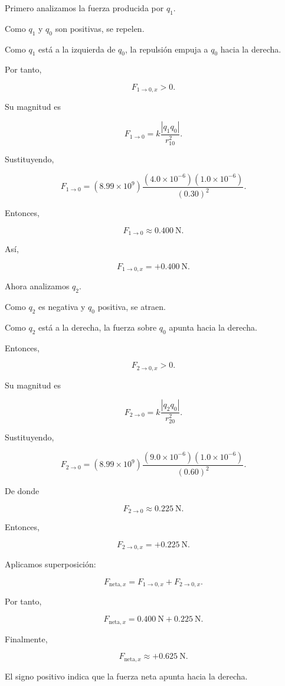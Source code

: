 Primero analizamos la fuerza producida por \(q_1\).

Como \(q_1\) y \(q_0\) son positivas, se repelen.

Como \(q_1\) está a la izquierda de \(q_0\), la repulsión empuja a \(q_0\)
hacia la derecha.

Por tanto,

\[
F_{1\to0,x}>0.
\]

Su magnitud es

\[
F_{1\to0}
=
k
\frac{|q_1q_0|}
{r_{10}^{2}}.
\]

Sustituyendo,

\[
F_{1\to0}
=
\left(8.99\times10^9\right)
\frac{
(4.0\times10^{-6})
(1.0\times10^{-6})
}{
(0.30)^2
}.
\]

Entonces,

\[
F_{1\to0}
\approx
\SI{0.400}{\newton}.
\]

Así,

\[
F_{1\to0,x}
=
+\SI{0.400}{\newton}.
\]

Ahora analizamos \(q_2\).

Como \(q_2\) es negativa y \(q_0\) positiva, se atraen.

Como \(q_2\) está a la derecha, la fuerza sobre \(q_0\) apunta hacia la
derecha.

Entonces,

\[
F_{2\to0,x}>0.
\]

Su magnitud es

\[
F_{2\to0}
=
k
\frac{|q_2q_0|}
{r_{20}^{2}}.
\]

Sustituyendo,

\[
F_{2\to0}
=
\left(8.99\times10^9\right)
\frac{
(9.0\times10^{-6})
(1.0\times10^{-6})
}{
(0.60)^2
}.
\]

De donde

\[
F_{2\to0}
\approx
\SI{0.225}{\newton}.
\]

Entonces,

\[
F_{2\to0,x}
=
+\SI{0.225}{\newton}.
\]

Aplicamos superposición:

\[
F_{\text{neta},x}
=
F_{1\to0,x}
+
F_{2\to0,x}.
\]

Por tanto,

\[
F_{\text{neta},x}
=
\SI{0.400}{\newton}
+
\SI{0.225}{\newton}.
\]

Finalmente,

\[
\boxed{
F_{\text{neta},x}
\approx
+\SI{0.625}{\newton}
}.
\]

El signo positivo indica que la fuerza neta apunta hacia la derecha.

